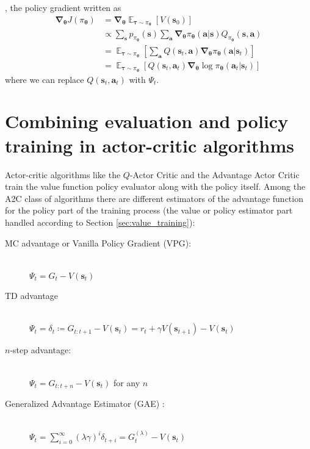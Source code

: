 \documentclass{article}
\begin{document}
\cite{sutton_barto_rl}, the policy gradient written as\begin{equation}\begin{split}\boldsymbol{\nabla}_{\boldsymbol{\theta}}J(\pi_{\boldsymbol{\theta}})&=\boldsymbol{\nabla}_{\boldsymbol{\theta}}\mathop{\mathbb{E}}_{\boldsymbol{\tau}\sim\pi_{\boldsymbol{\theta}}}[V(\mathbf{s}_0)]\\&\propto\sum_\mathbf{s}p_{\pi_{\boldsymbol{\theta}}}(\mathbf{s})\sum_\mathbf{a}\boldsymbol{\nabla}_{\boldsymbol{\theta}}\pi_{\boldsymbol{\theta}}(\mathbf{a}|\mathbf{s})Q_{\pi_{\boldsymbol{\theta}}}(\mathbf{s},\mathbf{a})\\&=\mathop{\mathbb{E}}_{\boldsymbol{\tau}\sim\pi_{\boldsymbol{\theta}}}\left[\sum_\mathbf{a}Q(\mathbf{s}_t, \mathbf{a})\boldsymbol{\nabla}_{\boldsymbol{\theta}}\pi_{\boldsymbol{\theta}}(\mathbf{a}|\mathbf{s}_t)\right]\\&=\mathop{\mathbb{E}}_{\boldsymbol{\tau}\sim\pi_{\boldsymbol{\theta}}}\left[Q(\mathbf{s}_t, \mathbf{a}_t)\boldsymbol{\nabla}_{\boldsymbol{\theta}}\log\pi_{\boldsymbol{\theta}}(\mathbf{a}_t|\mathbf{s}_t)\right]\end{split}\end{equation}where we can replace $Q(\mathbf{s}_t,\mathbf{a}_t)$ with $\Psi_t$.

\section{Combining evaluation and policy training in actor-critic algorithms}
Actor-critic algorithms like the $Q$-Actor Critic and the Advantage Actor Critic train the value function policy evaluator along with the policy itself. Among the A2C class of algorithms there are different estimators of the advantage function for the policy part of the training process (the value or policy estimator part handled according to Section \ref{sec:value_training}):
\begin{description}
\item[MC advantage or Vanilla Policy Gradient (VPG):]\hfill \\
$\Psi_t =G_t-V(\mathbf{s}_t)$
\item[TD advantage]\hfill \\
$\Psi_t =\delta_t\coloneqq G_{t:t+1}-V(\mathbf{s}_t)= r_t+\gamma V(\mathbf{s}_{t+1})-V(\mathbf{s}_t)$
\item[$n$-step advantage:]\hfill \\
$\Psi_t =G_{t:t+n}-V(\mathbf{s}_t)$ for any $n$
\item[Generalized Advantage Estimator (GAE) :]\hfill \\ 
$\Psi_t=\sum_{i=0}^\infty(\lambda\gamma)^i\delta_{t+i}=G^{(\lambda)}_t-V(\mathbf{s}_{t})$
\end{description}
\end{document}
